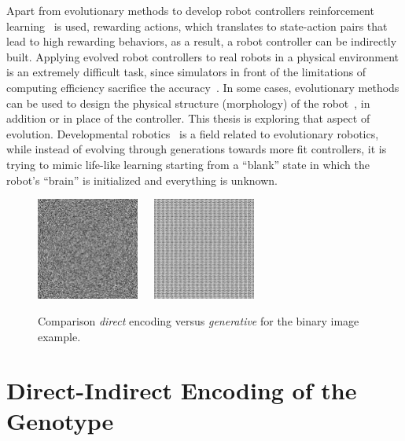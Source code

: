 Apart from evolutionary methods to develop robot controllers reinforcement learning~\citep{hayes1994robot,mahadevan1992automatic} is used, rewarding actions, which translates to state-action pairs that lead to high rewarding behaviors, as a result, a robot controller can be indirectly built. Applying evolved robot controllers to real robots in a physical environment is an extremely difficult task, since simulators in front of the limitations of computing efficiency sacrifice the accuracy~\citep{jakobi1995noise}. In some cases, evolutionary methods can be used to design the physical structure (morphology) of the robot~\citep{hiller2010evolving}, in addition or in place of the controller. This thesis is exploring that aspect of evolution. Developmental robotics~\citep{lungarella2003developmental,asada2001cognitive,weng2004developmental,asada2009cognitive} is a field related to evolutionary robotics,  while instead of evolving through generations towards more fit controllers, it is trying to mimic life-like learning starting from a ``blank'' state in which the robot's ``brain'' is initialized and everything is unknown.

\begin{figure}[t!]
\centering
\includegraphics[width=0.3\textwidth]{../Figures/Misc/direct.jpg}\  \   \   
\includegraphics[width=0.3\textwidth]{../Figures/Misc/indirect.jpg}
\caption{Comparison \emph{direct} encoding versus \emph{generative} for the binary image example.}
\label{fig:directVsIndirectEncoding}
\end{figure}


\section{Direct-Indirect Encoding of the Genotype}


